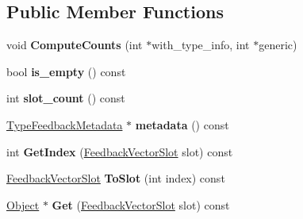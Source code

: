 \subsection*{Public Member Functions}
\begin{DoxyCompactItemize}
\item 
void {\bfseries Compute\+Counts} (int $\ast$with\+\_\+type\+\_\+info, int $\ast$generic)\hypertarget{classv8_1_1internal_1_1_type_feedback_vector_a724cc5ca9654d21cbc8db1c3756ca530}{}\label{classv8_1_1internal_1_1_type_feedback_vector_a724cc5ca9654d21cbc8db1c3756ca530}

\item 
bool {\bfseries is\+\_\+empty} () const \hypertarget{classv8_1_1internal_1_1_type_feedback_vector_a216bdd5e8455b0aab170ab7437fa018c}{}\label{classv8_1_1internal_1_1_type_feedback_vector_a216bdd5e8455b0aab170ab7437fa018c}

\item 
int {\bfseries slot\+\_\+count} () const \hypertarget{classv8_1_1internal_1_1_type_feedback_vector_af08a77e8cc80ca837770dba01f9bf468}{}\label{classv8_1_1internal_1_1_type_feedback_vector_af08a77e8cc80ca837770dba01f9bf468}

\item 
\hyperlink{classv8_1_1internal_1_1_type_feedback_metadata}{Type\+Feedback\+Metadata} $\ast$ {\bfseries metadata} () const \hypertarget{classv8_1_1internal_1_1_type_feedback_vector_a319c20b012e913d8939043bc98d9235f}{}\label{classv8_1_1internal_1_1_type_feedback_vector_a319c20b012e913d8939043bc98d9235f}

\item 
int {\bfseries Get\+Index} (\hyperlink{classv8_1_1internal_1_1_feedback_vector_slot}{Feedback\+Vector\+Slot} slot) const \hypertarget{classv8_1_1internal_1_1_type_feedback_vector_a9c25c54d83001f4e1ecee52569a642df}{}\label{classv8_1_1internal_1_1_type_feedback_vector_a9c25c54d83001f4e1ecee52569a642df}

\item 
\hyperlink{classv8_1_1internal_1_1_feedback_vector_slot}{Feedback\+Vector\+Slot} {\bfseries To\+Slot} (int index) const \hypertarget{classv8_1_1internal_1_1_type_feedback_vector_afaa64268bc29a8ce97c03c9de3f46900}{}\label{classv8_1_1internal_1_1_type_feedback_vector_afaa64268bc29a8ce97c03c9de3f46900}

\item 
\hyperlink{classv8_1_1internal_1_1_object}{Object} $\ast$ {\bfseries Get} (\hyperlink{classv8_1_1internal_1_1_feedback_vector_slot}{Feedback\+Vector\+Slot} slot) const \hypertarget{classv8_1_1internal_1_1_type_feedback_vector_aa1927df73f6925121ebcdba66655b02f}{}\label{classv8_1_1internal_1_1_type_feedback_vector_aa1927df73f6925121ebcdba66655b02f}


\end{DoxyCompactItemize}
